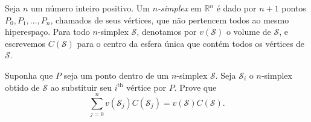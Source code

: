 Seja \(n\) um número inteiro positivo. Um \emph{\(n\)-simplex} em \(\mathbb{R}^n\) é dado por \(n+1\) pontos \(P_0, P_1,\dots, P_n\), chamados de seus vértices, que não pertencem todos ao mesmo hiperespaço. Para todo \(n\)-simplex \(\mathcal{S}\), denotamos por \(v(\mathcal{S})\) o volume de \(\mathcal{S}\), e escrevemos \(C(\mathcal{S})\) para o centro da esfera única que contém todos os vértices de \(\mathcal{S}\).

Suponha que \(P\) seja um ponto dentro de um \(n\)-simplex \(\mathcal{S}\). Seja \(\mathcal{S}_i\) o \(n\)-simplex obtido de \(\mathcal{S}\) ao substituir seu \(i^{\text{th}}\) vértice por \(P\). Prove que
\[
\sum_{j=0}^{n}v(\mathcal{S}_j)C(\mathcal{S}_j)=v(\mathcal{S})C(\mathcal{S}).
\]
